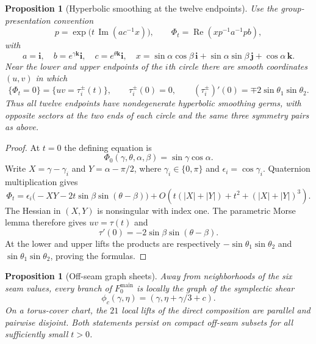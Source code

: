 \documentclass[11pt,reqno]{amsart}
\theoremstyle{plain}
\newtheorem{proposition}[theorem]{Proposition}
\theoremstyle{definition}
\begin{document}
\begin{proposition}[Hyperbolic smoothing at the twelve endpoints]
\label{prop:hyperbolic-normal-form}
Use the group-presentation convention
\[
 p=\exp\!\bigl(t\,\operatorname{Im}(ac^{-1}x)\bigr),
 \qquad
 \Phi_t=\operatorname{Re}(xp^{-1}a^{-1}pb),
\]
with
\[
 a=\mathbf i,
 \quad b=e^{\gamma\mathbf k}\mathbf i,
 \quad c=e^{\theta\mathbf k}\mathbf i,
 \quad
 x=\sin\alpha\cos\beta\,\mathbf i
   +\sin\alpha\sin\beta\,\mathbf j+\cos\alpha\,\mathbf k.
\]
Near the lower and upper endpoints of the $i$th circle there are smooth coordinates $(u,v)$ in
which
\[
 \{\Phi_t=0\}=\{uv=\tau_i^\pm(t)\},
 \qquad
 \tau_i^\pm(0)=0,
 \qquad
 (\tau_i^\pm)'(0)=\mp2\sin\theta_1\sin\theta_2.
\]
Thus all twelve endpoints have nondegenerate hyperbolic smoothing germs, with opposite sectors at
the two ends of each circle and the same three symmetry pairs as above.
\end{proposition}

\begin{proof}
At $t=0$ the defining equation is
\[
 \Phi_0(\gamma,\theta,\alpha,\beta)=\sin\gamma\cos\alpha.
\]
Write $X=\gamma-\gamma_i$ and $Y=\alpha-\pi/2$, where
$\gamma_i\in\{0,\pi\}$ and $\epsilon_i=\cos\gamma_i$.  Quaternion multiplication gives
\[
 \Phi_t
 =\epsilon_i\bigl(-XY-2t\sin\beta\sin(\theta-\beta)\bigr)
  +O\!\left(t(|X|+|Y|)+t^2+(|X|+|Y|)^3\right).
\]
The Hessian in $(X,Y)$ is nonsingular with index one.  The parametric Morse lemma therefore gives
$uv=\tau(t)$ and
\[
 \tau'(0)=-2\sin\beta\sin(\theta-\beta).
\]
At the lower and upper lifts the products are respectively
$-\sin\theta_1\sin\theta_2$ and $\sin\theta_1\sin\theta_2$, proving the formulas.
\end{proof}

\begin{proposition}[Off-seam graph sheets]\label{prop:graph-sheets}
Away from neighborhoods of the six seam values, every branch of $F_0^{\mathrm{main}}$ is locally the graph of the
symplectic shear
\[
 \phi_c(\gamma,\eta)=(\gamma,\eta+\gamma/3+c).
\]
On a torus-cover chart, the $21$ local lifts of the direct composition are parallel and pairwise
disjoint.  Both statements persist on compact off-seam subsets for all sufficiently small $t>0$.
\end{proposition}
\end{document}
